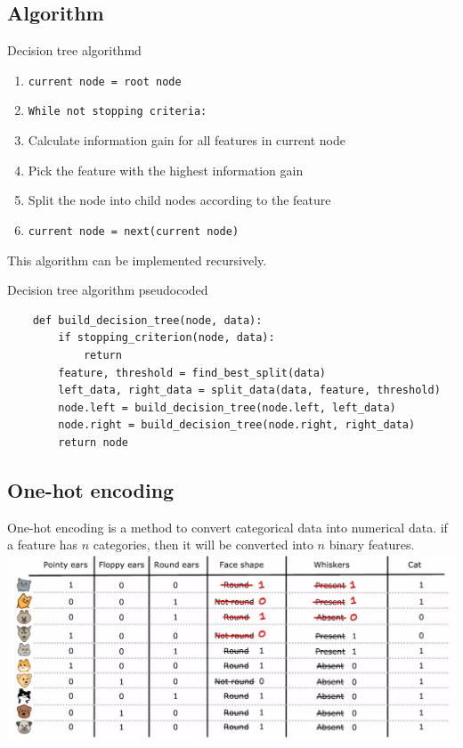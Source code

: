 \subsection*{Algorithm}
\begin{thmbox}{Decision tree algorithm}{d}
\begin{enumerate}
    \item \texttt{current node = root node}
    \item \texttt{While not stopping criteria:}
    \item[] \quad Calculate information gain for all features in current node
    \item[] \quad Pick the feature with the highest information gain
    \item[] \quad Split the node into child nodes according to the feature
    \item[] \quad \texttt{current node = next(current node)}
\end{enumerate}
\end{thmbox}
\par
This algorithm can be implemented recursively.
\begin{thmbox}{Decision tree algorithm pseudocode}{d}
\begin{verbatim}
    def build_decision_tree(node, data):
        if stopping_criterion(node, data):
            return
        feature, threshold = find_best_split(data)
        left_data, right_data = split_data(data, feature, threshold)
        node.left = build_decision_tree(node.left, left_data)
        node.right = build_decision_tree(node.right, right_data)
        return node
\end{verbatim}
\end{thmbox}
\subsection*{One-hot encoding}
One-hot encoding is a method to convert categorical data into numerical data.
if a feature has $n$ categories, then it will be converted into $n$ binary features.\\
\includegraphics*[width=\textwidth]{images/11.8}
